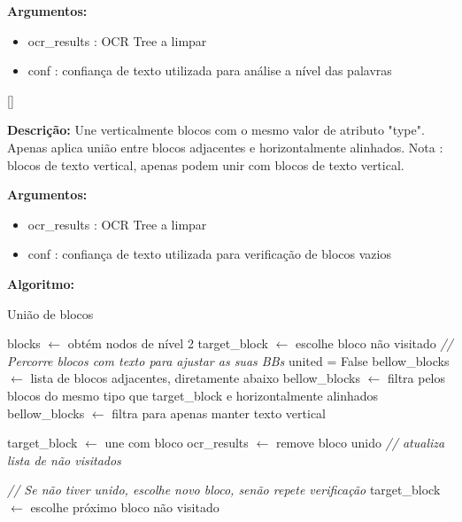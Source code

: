 \textbf{Argumentos:}
\begin{itemize}\setlength\itemsep{-0.3em}
	\item ocr\_results : OCR Tree a limpar
	\item conf : confiança de texto utilizada para análise a nível das palavras
\end{itemize}


[\normalsize]

\textbf{Descrição:} Une verticalmente blocos com o mesmo valor de atributo "type". Apenas aplica união entre blocos adjacentes e horizontalmente alinhados. Nota : blocos de texto vertical, apenas podem unir com blocos de texto vertical.

\textbf{Argumentos:}
\begin{itemize}\setlength\itemsep{-0.3em}
	\item ocr\_results : OCR Tree a limpar
	\item conf : confiança de texto utilizada para verificação de blocos vazios
\end{itemize}

\textbf{Algoritmo:}
\begin{algorithm}[H]
	\caption{União de blocos}
	\begin{algorithmic}[1]
		
		\STATE blocks $\leftarrow$ obtém nodos de nível 2
		\STATE target\_block $\leftarrow$ escolhe bloco não visitado
		\STATE \textit{// Percorre blocos com texto para ajustar as suas BBs}
			\STATE united = False
			\STATE bellow\_blocks $\leftarrow$ lista de blocos adjacentes, diretamente abaixo
			\STATE bellow\_blocks $\leftarrow$ filtra pelos blocos do mesmo tipo que target\_block e horizontalmente alinhados
					\STATE bellow\_blocks $\leftarrow$ filtra para apenas manter texto vertical
				\ENDIF
				
					\STATE target\_block $\leftarrow$ une com bloco
					\STATE ocr\_results $\leftarrow$ remove bloco unido
					\STATE \textit{// atualiza lista de não visitados}
				\ENDIF
				
			\ENDIF
			
			\STATE \textit{// Se não tiver unido, escolhe novo bloco, senão repete verificação}
				\STATE target\_block $\leftarrow$ escolhe próximo bloco não visitado
			\ENDIF
		\ENDWHILE
		
		
	\end{algorithmic}
\end{algorithm}

